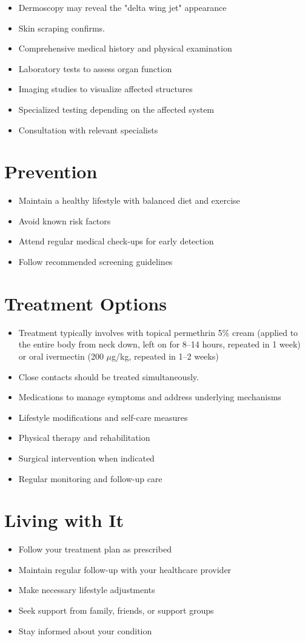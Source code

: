\begin{itemize}[noitemsep]
  \item Dermoscopy may reveal the "delta wing jet" appearance
  \item Skin scraping confirms.
  \item Comprehensive medical history and physical examination
  \item Laboratory tests to assess organ function
  \item Imaging studies to visualize affected structures
  \item Specialized testing depending on the affected system
  \item Consultation with relevant specialists
\end{itemize}
\section{Prevention}
\begin{itemize}[noitemsep]
  \item Maintain a healthy lifestyle with balanced diet and exercise
  \item Avoid known risk factors
  \item Attend regular medical check-ups for early detection
  \item Follow recommended screening guidelines
\end{itemize}
\section{Treatment Options}
\begin{itemize}[noitemsep]
  \item Treatment typically involves with topical permethrin 5\% cream (applied to the entire body from neck down, left on for 8--14 hours, repeated in 1 week) or oral ivermectin (200 $\mu$g/kg, repeated in 1--2 weeks)
  \item Close contacts should be treated simultaneously.
  \item Medications to manage symptoms and address underlying mechanisms
  \item Lifestyle modifications and self-care measures
  \item Physical therapy and rehabilitation
  \item Surgical intervention when indicated
  \item Regular monitoring and follow-up care
\end{itemize}
\section{Living with It}
\begin{itemize}[noitemsep]
  \item Follow your treatment plan as prescribed
  \item Maintain regular follow-up with your healthcare provider
  \item Make necessary lifestyle adjustments
  \item Seek support from family, friends, or support groups
  \item Stay informed about your condition
\end{itemize}
